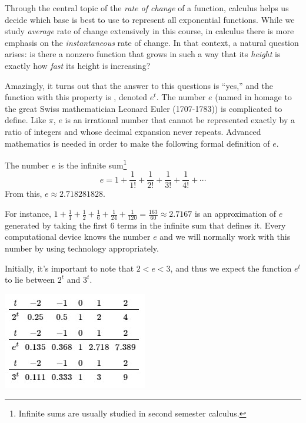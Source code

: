 \documentclass[nooutcomes]{ximera}
\begin{document}
Through the central topic of the \emph{rate of change} of a function, calculus helps us decide which base is best to use to represent all exponential functions.  While we study \emph{average} rate of change extensively in this course, in calculus there is more emphasis on the \emph{instantaneous} rate of change.  In that context, a natural question arises: is there a nonzero function that grows in such a way that its \emph{height} is exactly how \emph{fast} its height is increasing?

Amazingly, it turns out that the answer to this questions is ``yes,'' and the function with this property is , denoted \(e^t\). The number \(e\) (named in homage to the great Swiss mathematician Leonard Euler (1707-1783)) is complicated to define.  Like \(\pi\), \(e\) is an irrational number that cannot be represented exactly by a ratio of integers and whose decimal expansion never repeats.  Advanced mathematics is needed in order to make the following formal definition of \(e\).%

\begin{definition}
The number \(e\) is the infinite sum\footnote{Infinite sums are usually studied in second semester calculus.\label{fn-28}}%
\begin{equation*}
e = 1 + \frac{1}{1!} + \frac{1}{2!} + \frac{1}{3!} + \frac{1}{4!} + \cdots
\end{equation*}
From this, \(e \approx 2.718281828\).%
\end{definition}

For instance, \(1 + \frac{1}{1} + \frac{1}{2} + \frac{1}{6} + \frac{1}{24} + \frac{1}{120} = \frac{163}{60} \approx 2.7167\) is an approximation of \(e\) generated by taking the first \(6\) terms in the infinite sum that defines it.  Every computational device knows the number \(e\) and we will normally work with this number by using technology appropriately.

Initially, it's important to note that \(2 \lt e \lt 3\), and thus we expect the function \(e^t\) to lie between \(2^t\) and \(3^t\).

\begin{image}
\includegraphics{ExpText14}
\end{image}
\end{document}
